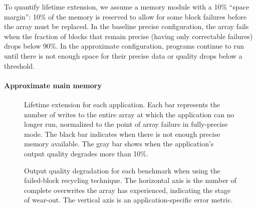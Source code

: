To quantify lifetime extension, we assume a memory module with a 10\% ``space
margin'': 10\% of the memory is reserved to allow for some block
failures before the array must be replaced. In the baseline precise
configuration, the array fails when the fraction of blocks that remain
precise (having only correctable failures) drops below 90\%. In the approximate
configuration, programs continue to run until there is not enough space for
their precise data or quality drops below a threshold.

\paragraph{Approximate main memory}

\begin{figure}
    \centering
    
    \caption{
        Lifetime extension for each application.
    Each bar represents the number of writes to the entire array at
    which the application can no longer run,
    normalized to the point of array failure in fully-precise mode.
    The black bar indicates when there is not enough precise
    memory available. The gray bar shows when the application's
    output quality degrades more than 10\%.
    }
    \label{approxstorage:fig:extension}
\end{figure}

\begin{figure}
    \centering
    \caption{
        Output quality degradation for each benchmark when using the
        failed-block recycling technique. The horizontal axis is the number of
        complete overwrites the array has experienced, indicating the stage of
        wear-out. The vertical axis is an application-specific error metric.
    }
\end{figure}

